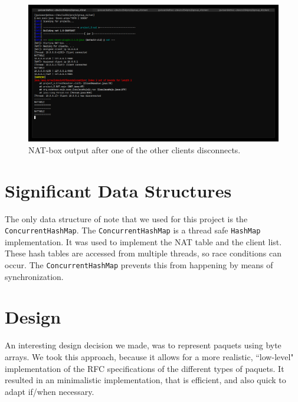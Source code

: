 \documentclass[10pt, a4paper]{article}
\begin{document}
\begin{figure}
  \centering
  \includegraphics[width=12cm]{exp2-3}
  \caption{NAT-box output after one of the other clients disconnects.}
  \label{fig:exp2-3}
\end{figure}



\section{Significant Data Structures}
\label{sec:sigds}

The only data structure of note that we used for this project is the
\texttt{ConcurrentHashMap}. The \texttt{ConcurrentHashMap} is a thread safe
\texttt{HashMap} implementation. It was used to implement the NAT table and the
client list. These hash tables are accessed from multiple threads, so race
conditions can occur. The \texttt{ConcurrentHashMap} prevents this from
happening by means of synchronization.



\section{Design}
\label{sec:design}

An interesting design decision we made, was to represent paquets using byte
arrays. We took this approach, because it allows for a more realistic,
``low-level" implementation of the RFC specifications of the different types of
paquets. It resulted in an minimalistic implementation, that is efficient, and
also quick to adapt if/when necessary.


\end{document}
